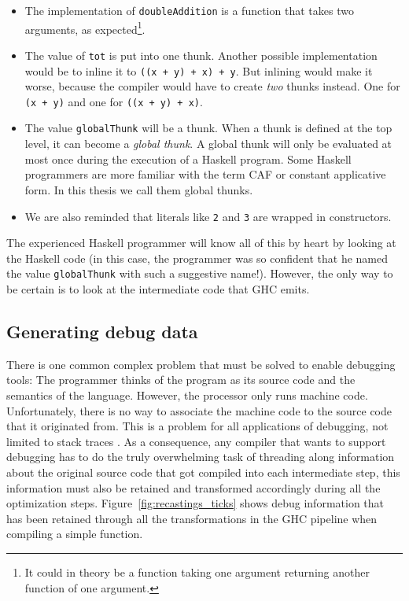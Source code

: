 \begin{itemize}
  \item
    The implementation of \texttt{doubleAddition} is a function that
    takes two arguments, as expected\footnote{It could in theory be a
      function taking one argument returning another function of one
      argument.}.
  \item
    The value of \texttt{tot} is put into one thunk. Another possible
    implementation would be to inline it to \texttt{((x + y) + x) +
      y}. But inlining would make it worse, because the compiler would
    have to create \emph{two} thunks instead. One for \texttt{(x +
      y)} and one for \texttt{((x + y) + x)}.
  \item
    The value \texttt{globalThunk} will be a thunk. When a thunk is
    defined at the top level, it can become a \emph{global thunk}.
    A global thunk will only be evaluated at most once during the
    execution of a Haskell program. Some Haskell programmers are more
    familiar with the term CAF or constant applicative form. In this
    thesis we call them global thunks.
  \item
    We are also reminded that literals like \texttt{2} and \texttt{3}
    are wrapped in constructors.

\end{itemize}

The experienced Haskell programmer will know all of this by heart
by looking at the Haskell code (in this case, the programmer was so
confident that he named the value \texttt{globalThunk} with such a
suggestive name!). However, the only way to be certain is
to look at the intermediate code that GHC emits.


\subsection{Generating debug data}

There is one common complex problem that must be solved to enable debugging
tools: The programmer thinks of the program as its source code and the
semantics of the language. However, the processor only runs machine code.
Unfortunately, there is no way to associate the machine code to the
source code that it originated from. This is a problem for all applications of
debugging, not limited to stack traces \cite{eager2012introduction}. As a consequence, any
compiler that wants to support debugging has to do the truly overwhelming task of threading along
information about the original source code that got compiled into each
intermediate step, this information must also be retained and transformed
accordingly during all the optimization steps. Figure~\ref{fig:recastings_ticks} shows
debug information that has been retained through all the transformations in
the GHC pipeline when compiling a simple function.

